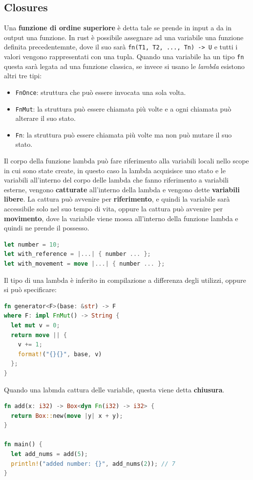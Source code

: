 \documentclass[12pt]{article}
\begin{document}
\subsection{Closures}
Una \textbf{funzione di ordine superiore} \`e detta tale se prende in input a da in output una funzione. In rust \`e possibile assegnare ad una variabile una funzione definita precedentemnte, dove il suo sar\`a \texttt{fn(T1, T2, ..., Tn) -> U} e tutti i valori vengono rappresentati con una tupla. Quando una variabile ha un tipo \texttt{fn} questa sar\`a legata ad una funzione classica, se invece si usano le \emph{lambda} esistono altri tre tipi:
\begin{itemize}
  \item \texttt{FnOnce}: struttura che pu\`o essere invocata una sola volta.
  \item \texttt{FnMut}: la struttura pu\`o essere chiamata pi\`u volte e a ogni chiamata pu\`o alterare il suo stato.
  \item \texttt{Fn}: la struttura pu\`o essere chiamata pi\`u volte ma non pu\`o mutare il suo stato.
\end{itemize}
Il corpo della funzione lambda pu\`o fare riferimento alla variabili locali nello scope in cui sono state create, in questo caso la lambda acquisisce uno stato e le variabili all'interno del corpo delle lambda che fanno riferimento a variabili esterne, vengono \textbf{catturate} all'interno della lambda e vengono dette \textbf{variabili libere}. La cattura pu\`o avvenire per \textbf{riferimento}, e quindi la variabile sar\`a accessibile solo nel suo tempo di vita, oppure la cattura pu\`o avvenire per \textbf{movimento}, dove la variabile viene mossa all'interno della funzione lambda e quindi ne prende il possesso.
\begin{lstlisting}[language=rust]
let number = 10;
let with_reference = |...| { number ... };
let with_movement = move |...| { number ... };
\end{lstlisting}
Il tipo di una lambda \`e inferito in compilazione a differenza degli utilizzi, oppure si pu\`o specificare:
\begin{lstlisting}[language=rust]
fn generator<F>(base: &str) -> F
where F: impl FnMut() -> String {
  let mut v = 0;
  return move || {
    v += 1;
    format!("{}{}", base, v)
  };
}
\end{lstlisting}
Quando una labmda cattura delle variabile, questa viene detta \textbf{chiusura}.
\begin{lstlisting}[language=rust]
fn add(x: i32) -> Box<dyn Fn(i32) -> i32> {
  return Box::new(move |y| x + y);
}

fn main() {
  let add_nums = add(5);
  println!("added number: {}", add_nums(2)); // 7
}
\end{lstlisting}
\end{document}
